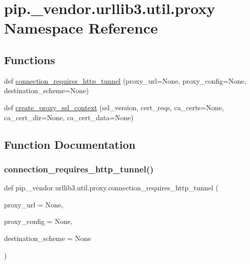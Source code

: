 \hypertarget{namespacepip_1_1__vendor_1_1urllib3_1_1util_1_1proxy}{}\section{pip.\+\_\+vendor.\+urllib3.\+util.\+proxy Namespace Reference}
\label{namespacepip_1_1__vendor_1_1urllib3_1_1util_1_1proxy}
\subsection*{Functions}
\begin{DoxyCompactItemize}
\item 
def \hyperlink{namespacepip_1_1__vendor_1_1urllib3_1_1util_1_1proxy_ac3fe4c59178bbf8faa07f501598d40a0}{connection\+\_\+requires\+\_\+http\+\_\+tunnel} (proxy\+\_\+url=None, proxy\+\_\+config=None, destination\+\_\+scheme=None)
\item 
def \hyperlink{namespacepip_1_1__vendor_1_1urllib3_1_1util_1_1proxy_a4a6fd6c289ceaf8a0d6d39940fc569f8}{create\+\_\+proxy\+\_\+ssl\+\_\+context} (ssl\+\_\+version, cert\+\_\+reqs, ca\+\_\+certs=None, ca\+\_\+cert\+\_\+dir=None, ca\+\_\+cert\+\_\+data=None)
\end{DoxyCompactItemize}


\subsection{Function Documentation}
\mbox{\label{namespacepip_1_1__vendor_1_1urllib3_1_1util_1_1proxy_ac3fe4c59178bbf8faa07f501598d40a0}} 
\subsubsection{\texorpdfstring{connection\+\_\+requires\+\_\+http\+\_\+tunnel()}{connection\_requires\_http\_tunnel()}}
{\footnotesize\ttfamily def pip.\+\_\+vendor.\+urllib3.\+util.\+proxy.\+connection\+\_\+requires\+\_\+http\+\_\+tunnel (\begin{DoxyParamCaption}\item[{}]{proxy\+\_\+url = {\ttfamily None},  }\item[{}]{proxy\+\_\+config = {\ttfamily None},  }\item[{}]{destination\+\_\+scheme = {\ttfamily None} }\end{DoxyParamCaption})}

